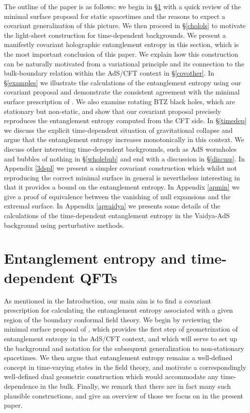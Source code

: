 \documentclass[12pt]{article}
\def\sec#1{\S \;\ref{#1}}
\def\App#1{Appendix \ref{#1}}
\begin{document}
The outline of the paper is as follows: we begin in \sec{lightsh}
with a quick review of the minimal surface proposal for static
spacetimes and the reasons to expect a covariant generalization of
this picture. We then proceed in \sec{cholols} to motivate the
light-sheet construction for time-dependent backgrounds. We present a manifestly
covariant holographic entanglement entropy in this section, which is
the most important conclusion of this paper. We explain
how this construction can be naturally motivated from a variational
principle and its connection to the bulk-boundary relation within the
AdS/CFT context in \sec{covother}. 
In \sec{examples} we illustrate the calculations of the
entanglement entropy using our covariant proposal and demonstrate
the consistent agreement with the minimal surface prescription of
\cite{Ryu:2006bv, Ryu:2006ef}. We also examine rotating BTZ black
holes, which are stationary but non-static, and show that our
covariant proposal precisely reproduces the entanglement entropy
computed from the CFT side.  In
\sec{timedep} we discuss the explicit time-dependent situation of
gravitational collapse and argue that the entanglement entropy
increases monotonically in this context. We discuss other
interesting time-dependent backgrounds, such as AdS wormholes and
bubbles of nothing in \sec{wholebub} and end with a discussion in
\sec{discuss}. In \App{3dspl} we present a simpler covariant
construction which whilst not reproducing the correct minimal
surface in general  is nevertheless interesting in that it provides
a bound on the entanglement entropy.  In \App{apmin} we give a proof
of equivalence between the vanishing of null expansions and the
extremal surface. In \App{apvaidya} we presents some details of the
calculations of the time-dependent entanglement entropy in the
Vaidya-AdS background using perturbative methods.


\section{Entanglement entropy and time-dependent QFTs}
\label{lightsh}
 As mentioned in the Introduction, our main aim is to find a covariant
 prescription for calculating the entanglement entropy associated with a
  given region of the boundary conformal field theory. We begin by reviewing the
  minimal surface proposal of \cite{Ryu:2006bv, Ryu:2006ef}, which
  provides the first step of
   geometrization of entanglement entropy in the AdS/CFT context, and which will
   serve to set up the background and notation for the subsequent generalization
   to non-stationary spacetimes.
 We then argue that entanglement entropy remains a well-defined concept in time-varying states in the field theory, and motivate a correspondingly well-defined dual geometric construction which would accommodate any time-dependence in the bulk.  Finally, we remark that there are in fact many such plausible constructions, and give an overview of those we focus on in the present paper.
\end{document}
